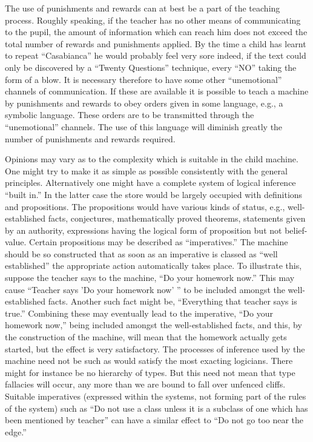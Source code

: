 \documentclass[10pt,twoside,openright]{memoir}
\begin{document}
The use of punishments and rewards can at best be a part of the teaching process. Roughly speaking, if the teacher has no other means of communicating to the pupil, the amount of information which can reach him does not exceed the total number of rewards and punishments applied. By the time a child has learnt to repeat ``Casabianca'' he would probably feel very sore indeed, if the text could only be discovered by a ``Twenty Questions'' technique, every ``NO'' taking the form of a blow. It is necessary therefore to have some other ``unemotional'' channels of communication. If these are available it is possible to teach a machine by punishments and rewards to obey orders given in some language, e.g., a symbolic language. These orders are to be transmitted through the ``unemotional'' channels. The use of this language will diminish greatly the number of punishments and rewards required.

Opinions may vary as to the complexity which is suitable in the child machine. One might try to make it as simple as possible consistently with the general principles. Alternatively one might have a complete system of logical inference ``built in.'' In the latter case the store would be largely occupied with definitions and propositions. The propositions would have various kinds of status, e.g., well-established facts, conjectures, mathematically proved theorems, statements given by an authority, expressions having the logical form of proposition but not belief-value. Certain propositions may be described as ``imperatives.'' The machine should be so constructed that as soon as an imperative is classed as ``well established'' the appropriate action automatically takes place. To illustrate this, suppose the teacher says to the machine, ``Do your homework now.'' This may cause ``Teacher says 'Do your homework now' '' to be included amongst the well-established facts. Another such fact might be, ``Everything that teacher says is true.'' Combining these may eventually lead to the imperative, ``Do your homework now,'' being included amongst the well-established facts, and this, by the construction of the machine, will mean that the homework actually gets started, but the effect is very satisfactory. The processes of inference used by the machine need not be such as would satisfy the most exacting logicians. There might for instance be no hierarchy of types. But this need not mean that type fallacies will occur, any more than we are bound to fall over unfenced cliffs. Suitable imperatives (expressed within the systems, not forming part of the rules of the system) such as ``Do not use a class unless it is a subclass of one which has been mentioned by teacher'' can have a similar effect to ``Do not go too near the edge.''
\end{document}
